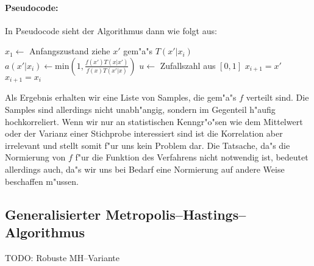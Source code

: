 	\paragraph{Pseudocode:}
	In Pseudocode sieht der Algorithmus dann wie folgt aus:
	\begin{algorithmic}
		\STATE $x_1 \leftarrow$ Anfangszustand
			\STATE ziehe $x'$ gem"a"s $T(x'|x_i)$
			\STATE $a(x'|x_i) \leftarrow \text{min}\left(1, \frac{f(x')T(x|x')}{f(x)T(x'|x)}\right)$
			\STATE $u\leftarrow$ Zufallszahl aus $[0,1]$
				\STATE $x_{i+1}=x'$
			\ELSE	\STATE $x_{i+1}=x_i$
			\ENDIF
	  \ENDFOR
	\end{algorithmic}
	Als Ergebnis erhalten wir eine Liste von Samples, die gem"a"s $f$ verteilt sind. Die Samples sind allerdings nicht unabh"angig, sondern im Gegenteil h"aufig hochkorreliert. Wenn wir nur an statistischen Kenngr"o"sen wie dem Mittelwert oder der Varianz einer Stichprobe interessiert sind ist die Korrelation aber irrelevant und stellt somit f"ur uns kein Problem dar. Die Tatsache, da"s die Normierung von $f$ f"ur die Funktion des Verfahrens nicht notwendig ist, bedeutet allerdings auch, da"s wir uns bei Bedarf eine Normierung auf andere Weise beschaffen m"ussen.
	
	
	\subsection{Generalisierter Metropolis--Hastings--Algorithmus}
	TODO: Robuste MH--Variante

